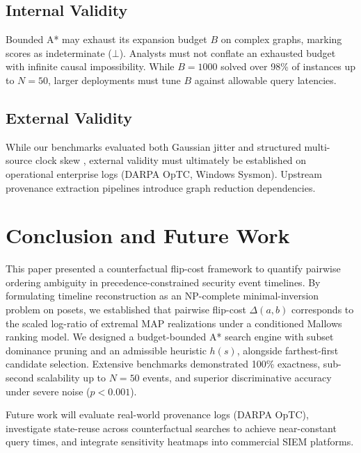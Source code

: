 \documentclass[journal]{IEEEtran}
\begin{document}
\subsection{Internal Validity}
Bounded A* may exhaust its expansion budget $B$ on complex graphs, marking scores as indeterminate ($\bot$). Analysts must not conflate an exhausted budget with infinite causal impossibility. While $B = 1000$ solved over 98\% of instances up to $N = 50$, larger deployments must tune $B$ against allowable query latencies.

\subsection{External Validity}
While our benchmarks evaluated both Gaussian jitter and structured multi-source clock skew \cite{Kimm2026}, external validity must ultimately be established on operational enterprise logs (DARPA OpTC, Windows Sysmon). Upstream provenance extraction pipelines \cite{Hossain2017, Cheng2024} introduce graph reduction dependencies.

\section{Conclusion and Future Work}
\label{sec:conclusion}

This paper presented a counterfactual flip-cost framework to quantify pairwise ordering ambiguity in precedence-constrained security event timelines. By formulating timeline reconstruction as an NP-complete minimal-inversion problem on posets, we established that pairwise flip-cost $\Delta(a, b)$ corresponds to the scaled log-ratio of extremal MAP realizations under a conditioned Mallows ranking model. We designed a budget-bounded A* search engine with subset dominance pruning and an admissible heuristic $h(s)$, alongside farthest-first candidate selection. Extensive benchmarks demonstrated 100\% exactness, sub-second scalability up to $N = 50$ events, and superior discriminative accuracy under severe noise ($p < 0.001$).

Future work will evaluate real-world provenance logs (DARPA OpTC), investigate state-reuse across counterfactual searches to achieve near-constant query times, and integrate sensitivity heatmaps into commercial SIEM platforms.

\balance


\end{document}
